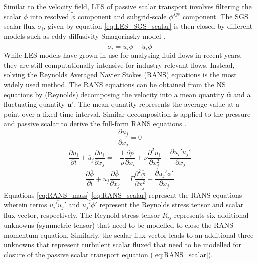 Similar to the velocity field, LES of passive scalar transport involves filtering the scalar $\phi$ into resolved $\widetilde{\phi}$ component and subgrid-scale $\phi^{sgs}$ component. The SGS scalar flux $\sigma_{i}$, given by equation \ref{eq:LES_SGS_scalar} is then closed by different models such as eddy diffusivity Smagorinsky model \cite{Burton2005}.  
\begin{equation}
\label{eq:LES_SGS_scalar}
\sigma_{i} = \widetilde{u_{i}\phi} - \widetilde{u_{i}}\widetilde{\phi}
\end{equation}
While LES models have grown in use for analysing fluid flows in recent years, they are still computationally intensive for industry relevant flows. Instead, solving the Reynolds Averaged Navier Stokes (RANS) equations is the most widely used method. The RANS equations can be obtained from the NS equations by (Reynolds) decomposing the velocity into a mean quantity $\bar{\mathbf{u}}$ and a fluctuating quantity $\mathbf{u'}$. The mean quantity represents the average value at a point over a fixed time interval. Similar decomposition is applied to the pressure and passive scalar to derive the full-form RANS equations \cite{Rossi2010}.
\begin{equation}
\label{eq:RANS_mass}
\frac{\partial\overline{u}_{j}}{\partial x_{j}} = 0
\end{equation}   
\begin{equation}
\label{eq:RANS_momentum}
\frac{\partial \overline{u}_{i}}{\partial t} + \overline{u}_{j}\frac{\partial \overline{u}_{i}}{\partial x_{j}} = -\frac{1}{\rho}\frac{\partial \overline{p}}{\partial x_{i}} + \nu \frac{\partial^{2}\overline{u}_{i}}{\partial x_{j}^{2}} - \frac{\partial \overline{u_{i}'u_{j}'}}{\partial x_{j}}  
\end{equation}
\begin{equation}
\label{eq:RANS_scalar}
\frac{\partial \overline{\phi}}{\partial t} + \overline{u}_{j}\frac{\partial \overline{\phi}}{\partial x_{j}} = \Gamma \frac{\partial^{2} \overline{\phi}}{\partial x_{j}^{2}} - \frac{\partial \overline{u_{j}'\phi'}}{\partial x_{j}}
\end{equation}
Equations \ref{eq:RANS_mass}-\ref{eq:RANS_scalar} represent the RANS equations wherein terms $\overline{u_{i}'u_{j}'}$ and $\overline{u_{j}'\phi'}$ represent the Reynolds stress tensor and scalar flux vector, respectively. The Reynold stress tensor $R_{ij}$ represents six additional unknowns (symmetric tensor) that need to be modelled to close the RANS momentum equation. Similarly, the scalar flux vector leads to an additional three unknowns that represent turbulent scalar fluxed that need to be modelled for closure of the passive scalar transport equation (\ref{eq:RANS_scalar}).

